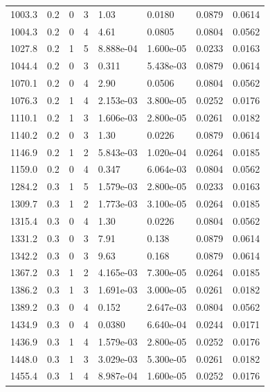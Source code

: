 \documentclass[preview]{standalone}
\begin{document}
{{{\begin{tabular}{L{1.2cm}C{1.2cm} C{0.3cm}C{0.5cm} C{1.4cm}C{1.4cm} C{1.4cm}C{1.4cm}}
  1003.3  &   0.2  & 0     &  3 &  1.03  & 0.0180  & 0.0879 &  0.0614   \\ 
  1004.3  &   0.2  & 0     &  4 &  4.61  & 0.0805  & 0.0804 &  0.0562   \\ 
  1027.8  &   0.2  & 1     &  5 &  8.888e-04  & 1.600e-05  & 0.0233 &  0.0163   \\ 
  1044.4  &   0.2  & 0     &  3 &  0.311  & 5.438e-03  & 0.0879 &  0.0614   \\ 
  1070.1  &   0.2  & 0     &  4 &  2.90  & 0.0506  & 0.0804 &  0.0562   \\ 
  1076.3  &   0.2  & 1     &  4 &  2.153e-03  & 3.800e-05  & 0.0252 &  0.0176   \\ 
  1110.1  &   0.2  & 1     &  3 &  1.606e-03  & 2.800e-05  & 0.0261 &  0.0182   \\ 
  1140.2  &   0.2  & 0     &  3 &  1.30  & 0.0226  & 0.0879 &  0.0614   \\ 
  1146.9  &   0.2  & 1     &  2 &  5.843e-03  & 1.020e-04  & 0.0264 &  0.0185   \\ 
  1159.0  &   0.2  & 0     &  4 &  0.347  & 6.064e-03  & 0.0804 &  0.0562   \\ 
  1284.2  &   0.3  & 1     &  5 &  1.579e-03  & 2.800e-05  & 0.0233 &  0.0163   \\ 
  1309.7  &   0.3  & 1     &  2 &  1.773e-03  & 3.100e-05  & 0.0264 &  0.0185   \\ 
  1315.4  &   0.3  & 0     &  4 &  1.30  & 0.0226  & 0.0804 &  0.0562   \\ 
  1331.2  &   0.3  & 0     &  3 &  7.91  & 0.138  & 0.0879 &  0.0614   \\ 
  1342.2  &   0.3  & 0     &  3 &  9.63  & 0.168  & 0.0879 &  0.0614   \\ 
  1367.2  &   0.3  & 1     &  2 &  4.165e-03  & 7.300e-05  & 0.0264 &  0.0185   \\ 
  1386.2  &   0.3  & 1     &  3 &  1.691e-03  & 3.000e-05  & 0.0261 &  0.0182   \\ 
  1389.2  &   0.3  & 0     &  4 &  0.152  & 2.647e-03  & 0.0804 &  0.0562   \\ 
  1434.9  &   0.3  & 0     &  4 &  0.0380  & 6.640e-04  & 0.0244 &  0.0171   \\ 
  1436.9  &   0.3  & 1     &  4 &  1.579e-03  & 2.800e-05  & 0.0252 &  0.0176   \\ 
  1448.0  &   0.3  & 1     &  3 &  3.029e-03  & 5.300e-05  & 0.0261 &  0.0182   \\ 
  1455.4  &   0.3  & 1     &  4 &  8.987e-04  & 1.600e-05  & 0.0252 &  0.0176   \\ 

\end{tabular}}}}
\end{document}
